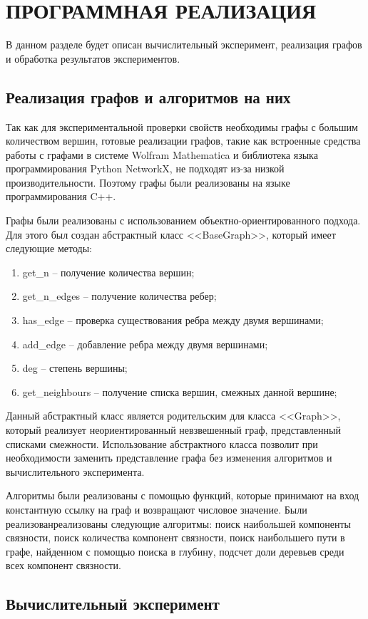 \section{ПРОГРАММНАЯ РЕАЛИЗАЦИЯ}
В данном разделе будет описан вычислительный эксперимент, 
реализация графов и обработка результатов экспериментов.
\subsection{Реализация графов и алгоритмов на них}

Так как для экспериментальной проверки свойств 
необходимы графы с большим количеством вершин,
готовые реализации графов, такие как
встроенные средства работы с графами в системе Wolfram Mathematica и 
библиотека языка программирования Python NetworkX,
не подходят из-за низкой производительности.
Поэтому графы были реализованы на языке программирования C++.

Графы были реализованы с использованием объектно-ориентированного подхода. Для этого был создан абстрактный класс <<BaseGraph>>, 
который имеет следующие методы:
\begin{enumerate}
    \item get\_n -- получение количества вершин;
    \item get\_n\_edges -- получение количества ребер;
    \item has\_edge -- проверка существования ребра между двумя вершинами;
    \item add\_edge -- добавление ребра между двумя вершинами;
    \item deg -- степень вершины;
    \item get\_neighbours -- получение списка вершин, смежных данной вершине;
\end{enumerate}
Данный абстрактный класс является родительским 
для класса <<Graph>>, который реализует неориентированный невзвешенный граф, представленный списками смежности. Использование
абстрактного класса позволит при необходимости 
заменить представление графа без изменения алгоритмов 
и вычислительного эксперимента.

Алгоритмы были реализованы с помощью функций, которые принимают 
на вход константную ссылку на граф и возвращают числовое значение. Были реализованреализованы следующие алгоритмы: поиск наибольшей компоненты связности, 
поиск количества компонент связности, поиск наибольшего пути 
в графе, найденном с помощью поиска в глубину, подсчет доли
деревьев среди всех компонент связности.
\subsection{Вычислительный эксперимент}

